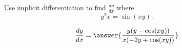 \documentclass{ximera}
\author{Steve Gubkin}
\begin{document}
\begin{exercise}

Use implicit differentiation to find $\frac{dy}{dx}$ where
\[
y^2x = \sin(xy).
\]
\begin{prompt}
\[
\frac{dy}{dx} = \answer{\frac{y(y-\cos(xy))}{x(-2y+\cos(xy))}}
\]
\end{prompt}
\end{exercise}
\end{document}
